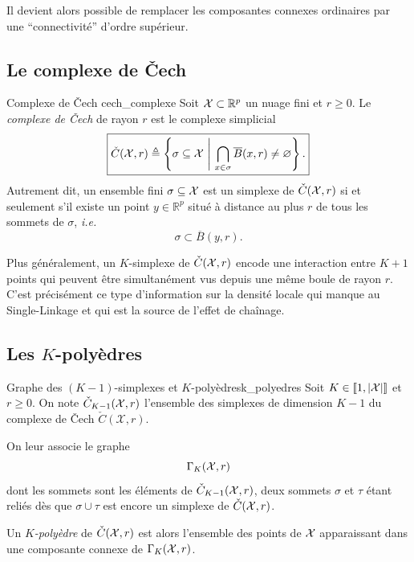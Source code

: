 Il devient alors possible de remplacer les composantes connexes ordinaires par une ``connectivité'' d'ordre supérieur.

\subsection{Le complexe de \v Cech}

\begin{Definition}{Complexe de \v Cech \cite{Cech1932, Munkres, BoissonnatChazalYvinec}}{cech_complexe}
Soit $\mathcal{X}\subset \mathbb R^p$ un nuage fini et $r\ge 0$. Le \emph{complexe de \v Cech} de rayon $r$ est le complexe simplicial
\[
\boxed{
    \check C(\X,r) \eqdef \left\{\sigma\subseteq \X \ \middle|\  \bigcap_{x\in \sigma}\overline B(x,r)\neq \varnothing \right\}.
    }
\]
Autrement dit, un ensemble fini $\sigma\subseteq \mathcal{X}$ est un simplexe de $\check C(\mathcal{X},r)$ si et seulement s'il existe un point $y\in\mathbb R^p$ situé à distance au plus $r$ de tous les sommets de $\sigma$, \emph{i.e.}
\[
\sigma \subset \overline B(y,r).
\]
\end{Definition}



Plus généralement, un $K$-simplexe de $\check C(\mathcal{X},r)$ encode une interaction entre $K+1$ points qui peuvent être simultanément vus depuis une même boule de rayon $r$. C'est précisément ce type d'information sur la densité locale qui manque au Single-Linkage et qui est la source de l'effet de chaînage.

\subsection{Les $K$-polyèdres}

\begin{Definition}{Graphe des $(K-1)$-simplexes et $K$-polyèdres}{k_polyedres}
Soit $K\in \left[\!\left[ 1,|\mathcal{X}| \right]\!\right]$ et $r\ge 0$. On note $\check C_{K-1}(\mathcal{X},r)$ l'ensemble des simplexes de dimension $K-1$ du complexe de \v Cech $\check C(\mathcal X, r)$.

On leur associe le graphe
\[
    \Gamma_K(\mathcal{X},r)
\]
dont les sommets sont les éléments de $\check C_{K-1}(\mathcal{X},r)$, deux sommets $\sigma$ et $\tau$ étant reliés dès que $\sigma\cup\tau$ est encore un simplexe de $\check C(\mathcal{X},r)$.

Un \emph{$K$-polyèdre} de $\check C(\mathcal{X},r)$ est alors l'ensemble des points de $\mathcal{X}$ apparaissant dans une composante connexe de $\Gamma_K(\mathcal{X},r)$.
\end{Definition}

